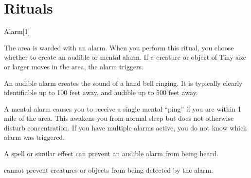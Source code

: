 \section{Rituals}

\small

\begin{spellsection}{Alarm}[1]
    \begin{spellheader}
    \end{spellheader}
    \begin{spellcontent}
        \begin{spelltargetinginfo}
        \end{spelltargetinginfo}
        \begin{spelleffects}
            \spelleffect The area is warded with an alarm. When you perform this ritual, you choose whether to create an audible or mental alarm. If a creature or object of Tiny size or larger moves in the area, the alarm triggers.

            An audible alarm creates the sound of a hand bell ringing. It is typically clearly identifiable up to 100 feet away, and audible up to 500 feet away.

            A mental alarm causes you to receive a single mental ``ping'' if you are within 1 mile of the area. This awakens you from normal sleep but does not otherwise disturb concentration. If you have multiple alarms active, you do not know which alarm was triggered.
            \spelldur \durext \dismissable
        \end{spelleffects}
    \end{spellcontent}
    \begin{spellfooter}
        \spellnotes A  spell or similar effect can prevent an audible alarm from being heard.

         cannot prevent creatures or objects from being detected by the alarm.
    \end{spellfooter}
    \begin{spellaugments}
    \end{spellaugments}
\end{spellsection}

